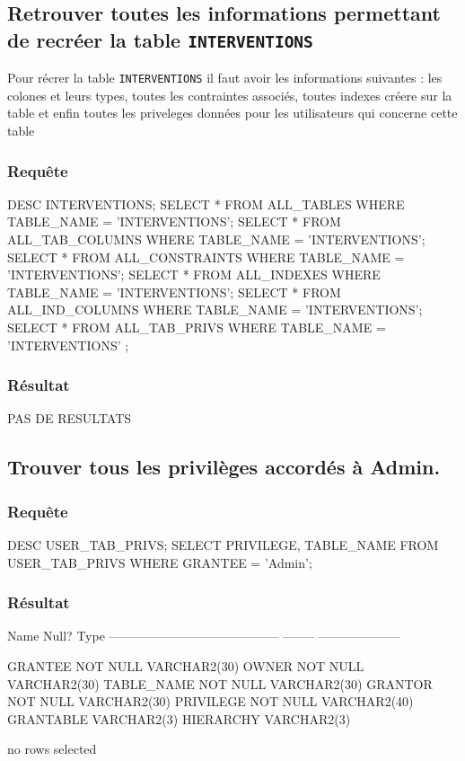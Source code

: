 \documentclass[•]{article}
\begin{document}
\subsection{Retrouver toutes les informations permettant de recréer la table \texttt{INTERVENTIONS}}
Pour récrer la table \texttt{INTERVENTIONS} il faut avoir les informations suivantes : les colones et leurs types, toutes les contraintes associés, toutes indexes créere sur la table et enfin toutes les priveleges données pour les utilisateurs qui concerne cette table

\subsubsection{Requête}
\begin{sql}
 DESC INTERVENTIONS;
 SELECT * FROM ALL_TABLES WHERE TABLE_NAME = 'INTERVENTIONS';
 SELECT * FROM ALL_TAB_COLUMNS WHERE TABLE_NAME = 'INTERVENTIONS';
 SELECT * FROM ALL_CONSTRAINTS WHERE TABLE_NAME = 'INTERVENTIONS';
 SELECT * FROM ALL_INDEXES WHERE TABLE_NAME = 'INTERVENTIONS';
 SELECT * FROM ALL_IND_COLUMNS WHERE TABLE_NAME = 'INTERVENTIONS';
 SELECT * FROM ALL_TAB_PRIVS WHERE TABLE_NAME = 'INTERVENTIONS' ;
\end{sql}

\subsubsection{Résultat}
\begin{sql}
PAS DE RESULTATS
\end{sql}

\subsection{Trouver tous les privilèges accordés à Admin.}
\subsubsection{Requête}
\begin{sql}
DESC USER_TAB_PRIVS;
SELECT PRIVILEGE, TABLE_NAME FROM USER_TAB_PRIVS WHERE GRANTEE = 'Admin';
\end{sql}
\subsubsection{Résultat}
\begin{sql}
  Name                                      Null?    Type
 ----------------------------------------- -------- --------------------

 GRANTEE                                   NOT NULL VARCHAR2(30)
 OWNER                                     NOT NULL VARCHAR2(30)
 TABLE_NAME                                NOT NULL VARCHAR2(30)
 GRANTOR                                   NOT NULL VARCHAR2(30)
 PRIVILEGE                                 NOT NULL VARCHAR2(40)
 GRANTABLE                                          VARCHAR2(3)
 HIERARCHY                                          VARCHAR2(3)

no rows selected
 \end{sql}
\end{document}
